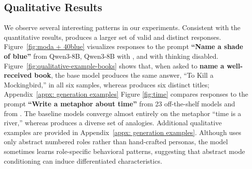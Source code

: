 

\subsection{Qualitative Results}
\label{sec:qualitative results}
We observe several interesting patterns in our experiments. Consistent with the quantitative results, \method{} produces a larger set of valid and distinct responses.  Figure~\ref{fig:moda + 40blue} visualizes responses to the prompt \textbf{``Name a shade of blue''} from Qwen3-8B, Qwen3-8B with \ssot, and \method{} with thinking disabled. Figure~\ref{fig:qualitative-example-books} shows that, when asked to \textbf{name a well-received book}, the base model produces the same answer, ``To Kill a Mockingbird,'' in all six samples, whereas \method{} produces six distinct titles; Appendix~\ref{appx: generation examples} Figure \ref{fig:time} compares responses to the prompt \textbf{``Write a metaphor about time''} from 23 off-the-shelf models and from \method{}. The baseline models converge almost entirely on the metaphor ``time is a river,'' whereas \method{} produces a diverse set of analogies. Additional qualitative examples are provided in Appendix~\ref{appx: generation examples}. Although \method{} uses only abstract numbered roles rather than hand-crafted personas, the model sometimes learns role-specific behavioral patterns, suggesting that abstract mode conditioning can induce differentiated characteristics. 

